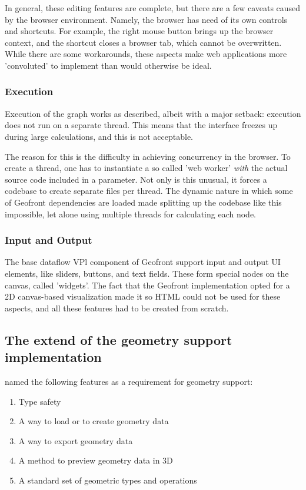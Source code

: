 In general, these editing features are complete, but there are a few caveats caused by the browser environment.
Namely, the browser has need of its own controls and shortcuts. 
For example, the right mouse button brings up the browser context, and the  shortcut closes a browser tab, which cannot be overwritten.
While there are some workarounds, these aspects make web applications more 'convoluted' to implement than would otherwise be ideal.

\subsubsection*{Execution}
Execution of the graph works as described, albeit with a major setback: execution does not run on a separate thread. 
This means that the interface freezes up during large calculations, and this is not acceptable. 

The reason for this is the difficulty in achieving concurrency in the browser. 
To create a thread, one has to instantiate a so called 'web worker' \emph{with} the actual source code included in a parameter. 
Not only is this unusual, it forces a codebase to create separate files per thread.
The dynamic nature in which some of Geofront dependencies are loaded made splitting up the codebase like this impossible, let alone using multiple threads for calculating each node.

\subsubsection*{Input and Output}
The base dataflow VPl component of Geofront support input and output UI elements, like sliders, buttons, and text fields.
These form special nodes on the canvas, called 'widgets'. 
The fact that the Geofront implementation opted for a 2D canvas-based visualization made it so HTML could not be used for these aspects, and all these features had to be created from scratch.



\subsection*{The extend of the geometry support implementation}

 named the following features as a requirement for geometry support:
\begin{enumerate}[-]
  \item Type safety 
  \item A way to load or to create geometry data 
  \item A way to export geometry data
  \item A method to preview geometry data in 3D
  \item A standard set of geometric types and operations
\end{enumerate}

